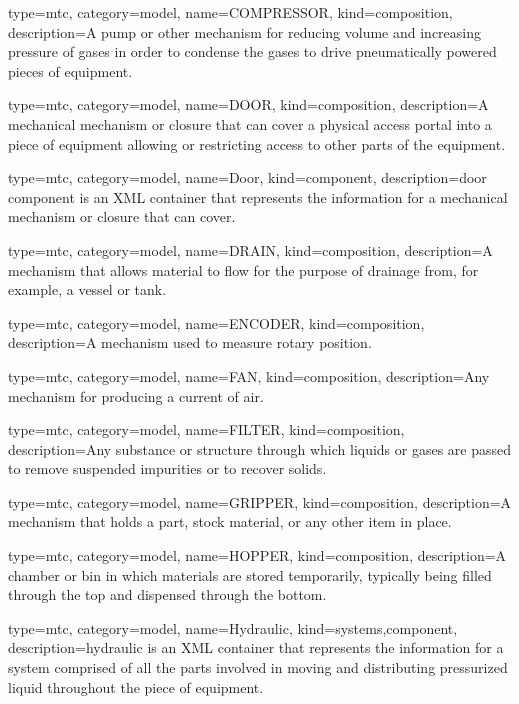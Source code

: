 {
  type=mtc,
  category=model,
  name={COMPRESSOR},
  kind={composition},
  description={A pump or other mechanism for reducing volume and increasing pressure of gases in order to condense the gases to drive pneumatically powered pieces of equipment.}
}


{
  type=mtc,
  category=model,
  name={DOOR},
  kind={composition},
  description={A mechanical mechanism or closure that can cover a physical access portal into a piece of equipment allowing or restricting access to other parts of the equipment.}
}


{
  type=mtc,
  category=model,
  name={Door},
  kind={component},
  description={\gls{door component} is an XML container that represents the information for a mechanical mechanism or closure that can cover.}
}


{
  type=mtc,
  category=model,
  name={DRAIN},
  kind={composition},
  description={A mechanism that allows material to flow for the purpose of drainage from, for example, a vessel or tank.}
}


{
  type=mtc,
  category=model,
  name={ENCODER},
  kind={composition},
  description={A mechanism used to measure rotary position.}
}


{
  type=mtc,
  category=model,
  name={FAN},
  kind={composition},
  description={Any mechanism for producing a current of air.}
}


{
  type=mtc,
  category=model,
  name={FILTER},
  kind={composition},
  description={Any substance or structure through which liquids or gases are passed to remove suspended impurities or to recover solids.}
}


{
  type=mtc,
  category=model,
  name={GRIPPER},
  kind={composition},
  description={A mechanism that holds a part, stock material, or any other item in place.}
}


{
  type=mtc,
  category=model,
  name={HOPPER},
  kind={composition},
  description={A chamber or bin in which materials are stored temporarily, typically being filled through the top and dispensed through the bottom.}
}


{
  type=mtc,
  category=model,
  name={Hydraulic},
  kind={systems,component},
  description={\gls{hydraulic} is an XML container that represents the information for a system comprised of all the parts involved in moving and distributing pressurized liquid throughout the piece of equipment.}
}


